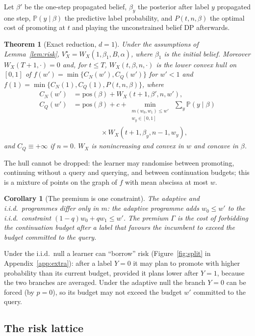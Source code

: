 \documentclass{article}
\theoremstyle{plain}
\newtheorem{theorem}{Theorem}
\newtheorem{corollary}{Corollary}
\theoremstyle{definition}
\theoremstyle{remark}
\newcommand{\PP}{\mathbb{P}}
\newcommand{\pos}{\mathrm{pos}}
\begin{document}
Let $\beta'$ be the one-step propagated belief, $\beta_y$ the posterior after label $y$ propagated one step, $\PP(y\mid\beta)$ the predictive label probability, and $P(t,n,\beta)$ the optimal cost of promoting at $t$ and playing the unconstrained belief DP afterwards.

\begin{theorem}[Exact reduction, $d=1$]
\label{thm:reduction}
Under the assumptions of Lemma~\ref{lem:risk}, $V^\star_X=W_X(1,\beta_1,B,\alpha)$, where $\beta_1$ is the initial belief. Moreover $W_X(T+1,\cdot)=0$ and, for $t\le T$, $W_X(t,\beta,n,\cdot)$ is the lower convex hull on $[0,1]$ of $f(w')=\min\{C_N(w'),C_Q(w')\}$ for $w'<1$ and $f(1)=\min\{C_N(1),C_Q(1),P(t,n,\beta)\}$, where
\begin{align*}
C_N(w')&=\pos(\beta)+W_X(t+1,\beta',n,w'),\\
C_Q(w')&=\pos(\beta)+c+\min_{\substack{m(w_0,w_1)\le w'\\ w_y\in[0,1]}}\ \textstyle\sum_{y}\PP(y\mid\beta)\\
&\qquad\qquad\times W_X(t+1,\beta_y,n-1,w_y),
\end{align*}
and $C_Q\equiv+\infty$ if $n=0$. $W_X$ is nonincreasing and convex in $w$ and concave in $\beta$.
\end{theorem}

The hull cannot be dropped: the learner may randomise between promoting, continuing without a query and querying, and between continuation budgets; this is a mixture of points on the graph of $f$ with mean abscissa at most $w$.

\begin{corollary}[The premium is one constraint]
\label{cor:oneconstraint}
The adaptive and i.i.d.\ programmes differ only in $m$: the adaptive programme adds $w_0\le w'$ to the i.i.d.\ constraint $(1-q)w_0+qw_1\le w'$. The premium $\Gamma$ is the cost of forbidding the continuation budget after a label that favours the incumbent to exceed the budget committed to the query.
\end{corollary}

Under the i.i.d.\ null a learner can ``borrow'' risk (Figure~\ref{fig:split} in Appendix~\ref{app:extra}): after a label $Y=0$ it may plan to promote with higher probability than its current budget, provided it plans lower after $Y=1$, because the two branches are averaged. Under the adaptive null the branch $Y=0$ can be forced (by $p=0$), so its budget may not exceed the budget $w'$ committed to the query.


\subsection{The risk lattice}
\end{document}
